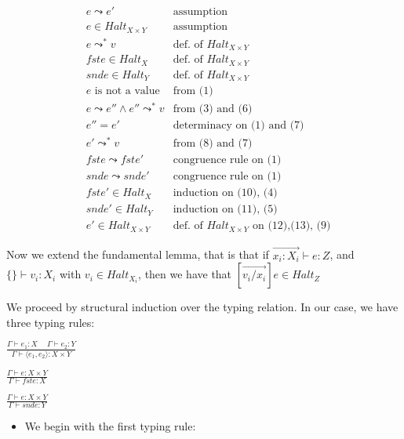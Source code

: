 \begin{enumerate}
\begin{itemize}
        \begin{align}
          &e \leadsto e' &\text{assumption}\\
          &e \in Halt_{X \times Y} &\text{assumption}\\
          &e \leadsto^* v &\text{def. of $Halt_{X \times Y}$}\\
          &fst e \in Halt_X &\text{def. of $Halt_{X \times Y}$}\\
          &snd e \in Halt_Y &\text{def. of $Halt_{X \times Y}$}\\
          &e\text{ is not a value} &\text{from (1)}\\
          &e \leadsto e'' \wedge e'' \leadsto^* v &\text{from (3) and (6)}\\
          &e'' = e' & \text{determinacy on (1) and (7)}\\
          &e' \leadsto^* v &\text{from (8) and (7)}\\
          &fst e \leadsto fst e' &\text{congruence rule on (1)}\\
          &snd e \leadsto snd e' &\text{congruence rule on (1)}\\
          &fst e' \in Halt_X &\text{induction on (10), (4)}\\
          &snd e' \in Halt_Y &\text{induction on (11), (5)}\\
          &e' \in Halt_{X \times Y}&\text{def. of $Halt_{X \times Y}$ on (12),(13), (9)}
        \end{align}
    \end{itemize}

    Now we extend the fundamental lemma, that is that if $\overrightarrow{x_i : X_i} \vdash e : Z$, and $\{\} \vdash v_i : X_i$ with $v_i \in Halt_{X_i}$, then we have that $[\overrightarrow{v_i / x_i}]e \in Halt_Z$

    We proceed by structural induction over the typing relation. In our case, we have three typing rules:

    $\frac{\Gamma \vdash e_1 : X \hspace{15pt} \Gamma \vdash e_2 : Y}{\Gamma \vdash \langle e_1, e_2 \rangle : X \times Y}$

    $\frac{\Gamma \vdash e : X \times Y}{\Gamma \vdash fst e : X}$

    $\frac{\Gamma \vdash e : X \times Y}{\Gamma \vdash snd e : Y}$

    \begin{itemize}
      \item
        We begin with the first typing rule:


\end{itemize}
\end{enumerate}
